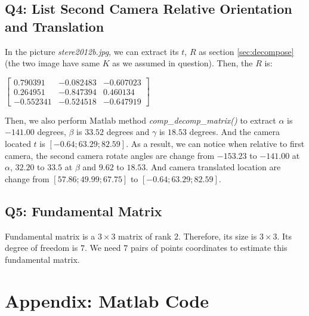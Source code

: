 \documentclass[12pt]{article}
\begin{document}
\subsection{Q4: List Second Camera Relative Orientation and Translation}

In the picture \textit{stere2012b.jpg}, we can extract its $t$, $R$ as section \ref{sec:decompose} (the two image have same $K$ as we assumed in question). Then, the $R$ is:

\begin{center}
$\begin{bmatrix} 	
	0.790391 & -0.082483 & -0.607023 \\  
	0.264951 & -0.847394 &  0.460134 \\  
   -0.552341 & -0.524518 & -0.647919
\end{bmatrix}$
\end{center}

Then, we also perform Matlab method \textit{comp\_decomp\_matrix()} to extract $\alpha$ is $-141.00$ degrees, $\beta$ is $33.52$ degrees and $\gamma$ is $18.53$ degrees. And the camera located $t$ is $[-0.64; 63.29; 82.59]$. As a result, we can notice when relative to first camera, the second camera rotate angles are change from $-153.23$ to $-141.00$ at $\alpha$, $32.20$ to $33.5$ at $\beta$ and $9.62$ to $18.53$. And camera translated location are change from $[57.86; 49.99; 67.75]$ to $[-0.64; 63.29; 82.59]$.

\subsection{Q5: Fundamental Matrix}

Fundamental matrix is a $3 \times 3$ matrix of rank $2$. Therefore, its size is $3 \times 3$. Its degree of freedom is $7$. We need $7$ pairs of points coordinates to estimate this fundamental matrix.

\section{Appendix: Matlab Code} 
\label{App:AppendixA}





\end{document}
